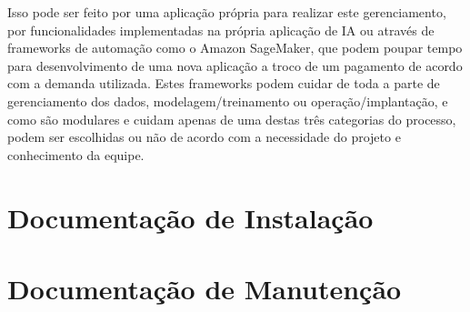 \documentclass[portugues]{ic-tese}
\begin{document}
Isso pode ser feito por uma aplicação própria para realizar este gerenciamento, por funcionalidades implementadas na própria aplicação de IA ou através de frameworks de automação como o Amazon SageMaker, que podem poupar tempo para desenvolvimento de uma nova aplicação a troco de um pagamento de acordo com a demanda utilizada. Estes frameworks podem cuidar de toda a parte de gerenciamento dos dados, modelagem/treinamento ou operação/implantação, e como são modulares e cuidam apenas de uma destas três categorias do processo, podem ser escolhidas ou não de acordo com a necessidade do projeto e conhecimento da equipe.


\annex
\chapter{Documentação de Instalação}

\chapter{Documentação de Manutenção}
\end{document}
